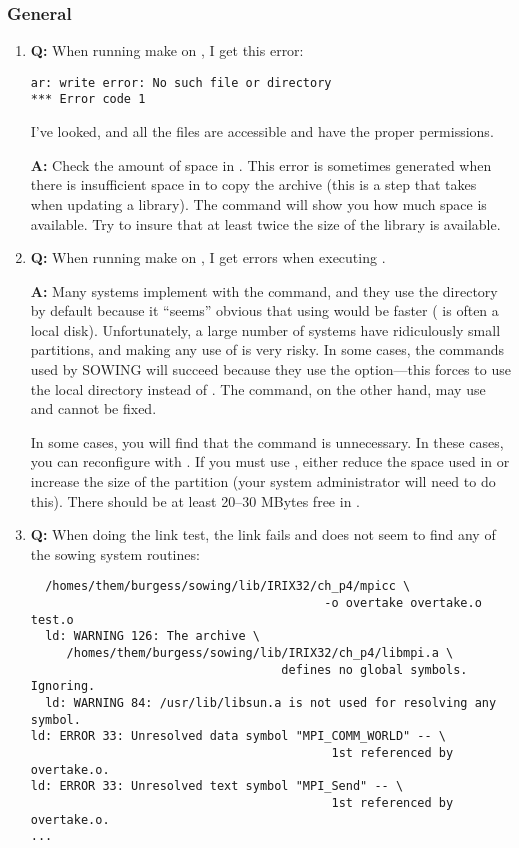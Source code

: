 \documentclass[11pt,twoside]{article}
\def\question{{\bf Q: }}
\def\answer{{\bf A: }}
\begin{document}
\subsubsection{General}
\begin{enumerate}
\item 
\question 
When running make on , I get this error:
\begin{verbatim}
ar: write error: No such file or directory
*** Error code 1
\end{verbatim}
I've looked, and all the files are accessible and have the proper permissions.

\answer 
Check the amount of space in .  This error is sometimes
generated when there is insufficient space in  to copy the archive
(this is a step that  takes when updating a library).  The command
 will show you how much space is available.  Try to insure that
at least twice the size of the library is available.

\item \question
When running make on , I get errors when executing .

\answer
Many systems implement  with the  command, and they use
the  directory by default because it ``seems'' obvious that using
 would be faster ( is often a local disk).
Unfortunately, a large number of systems have ridiculously small 
partitions, and making any use of  is very risky.  In some
cases, the  commands used by SOWING will succeed because they 
use the  option---this forces  to use the local directory 
instead of .  The  command, on the other hand, may use
 and cannot be fixed.

In some cases, you will find that the  command is unnecessary. 
In these cases, you can reconfigure with .  If you must use
, either reduce the space used in  or increase the
size of the  partition (your system administrator will need to do
this).  There should be at least 20--30 MBytes free in .

\item
\question
When doing the link test, the link fails and does not seem to find any of the
sowing system routines:
\noindent
\begin{small}
\begin{verbatim}
  /homes/them/burgess/sowing/lib/IRIX32/ch_p4/mpicc \
                                         -o overtake overtake.o test.o 
  ld: WARNING 126: The archive \
     /homes/them/burgess/sowing/lib/IRIX32/ch_p4/libmpi.a \
                                   defines no global symbols. Ignoring.
  ld: WARNING 84: /usr/lib/libsun.a is not used for resolving any symbol.
ld: ERROR 33: Unresolved data symbol "MPI_COMM_WORLD" -- \
                                          1st referenced by overtake.o.
ld: ERROR 33: Unresolved text symbol "MPI_Send" -- \
                                          1st referenced by overtake.o.
...
\end{verbatim}
\end{small}


\end{enumerate}
\end{document}
